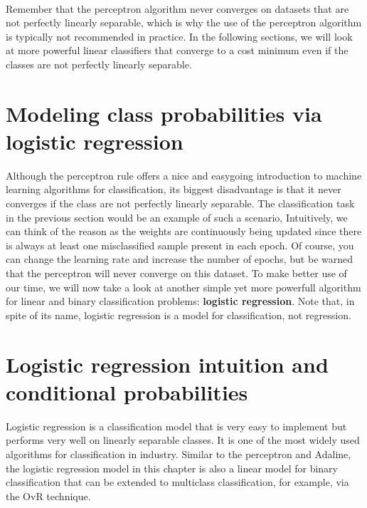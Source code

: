 \documentclass[11pt]{article}
\begin{document}
    \begin{center}
    \end{center}
    { \hspace*{\fill} \\}
    
    Remember that the perceptron algorithm never converges on datasets that
are not perfectly linearly separable, which is why the use of the
perceptron algorithm is typically not recommended in practice. In the
following sections, we will look at more powerful linear classifiers
that converge to a cost minimum even if the classes are not perfectly
linearly separable.

    \section{Modeling class probabilities via logistic
regression}\label{modeling-class-probabilities-via-logistic-regression}

    Although the perceptron rule offers a nice and easygoing introduction to
machine learning algorithms for classification, its biggest disadvantage
is that it never converges if the class are not perfectly linearly
separable. The classification task in the previous section would be an
example of such a scenario, Intuitively, we can think of the reason as
the weights are continuously being updated since there is always at
least one misclassified sample present in each epoch. Of course, you can
change the learning rate and increase the number of epochs, but be
warned that the perceptron will never converge on this dataset. To make
better use of our time, we will now take a look at another simple yet
more powerfull algorithm for linear and binary classification problems:
\textbf{logistic regression}. Note that, in spite of its name, logistic
regression is a model for classification, not regression.

    \section{Logistic regression intuition and conditional
probabilities}\label{logistic-regression-intuition-and-conditional-probabilities}

    Logistic regression is a classification model that is very easy to
implement but performs very well on linearly separable classes. It is
one of the most widely used algorithms for classification in industry.
Similar to the perceptron and Adaline, the logistic regression model in
this chapter is also a linear model for binary classification that can
be extended to multiclass classification, for example, via the OvR
technique.
\end{document}
